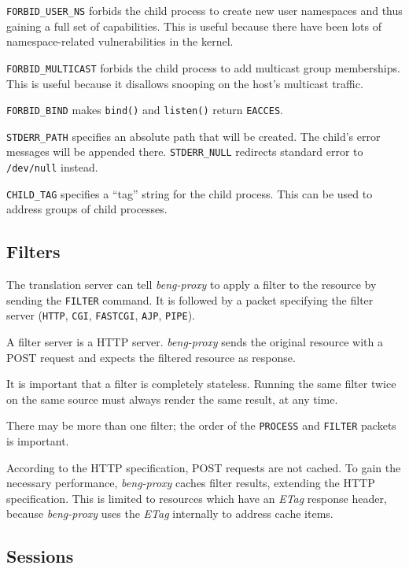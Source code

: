 \documentclass[a4paper,12pt]{article}
\begin{document}
\verb|FORBID_USER_NS| forbids the child process to create new user
namespaces and thus gaining a full set of capabilities.  This is
useful because there have been lots of namespace-related
vulnerabilities in the kernel.

\verb|FORBID_MULTICAST| forbids the child process to add multicast
group memberships.  This is useful because it disallows snooping on
the host's multicast traffic.

\verb|FORBID_BIND| makes \verb|bind()| and \verb|listen()| return
\verb|EACCES|.

\verb|STDERR_PATH| specifies an absolute path that will be created.
The child's error messages will be appended there.  \verb|STDERR_NULL|
redirects standard error to \texttt{/dev/null} instead.

\verb|CHILD_TAG| specifies a ``tag'' string for the child process.  This can be used to
address groups of child processes.

\subsection{Filters}
\label{filter}

The translation server can tell \emph{beng-proxy} to apply a filter to
the resource by sending the \verb|FILTER| command.  It is followed
by a packet specifying the filter server (\verb|HTTP|,
\verb|CGI|, \verb|FASTCGI|, \verb|AJP|, \verb|PIPE|).

A filter server is a HTTP server.  \emph{beng-proxy} sends the
original resource with a POST request and expects the filtered
resource as response.

It is important that a filter is completely stateless.  Running the
same filter twice on the same source must always render the same
result, at any time.

There may be more than one filter; the order of the \verb|PROCESS|
and \verb|FILTER| packets is important.

According to the HTTP specification, POST requests are not cached.  To
gain the necessary performance, \emph{beng-proxy} caches filter
results, extending the HTTP specification.  This is limited to
resources which have an \emph{ETag} response header, because
\emph{beng-proxy} uses the \emph{ETag} internally to address cache
items.

\subsection{Sessions}
\label{sessions}
\end{document}
